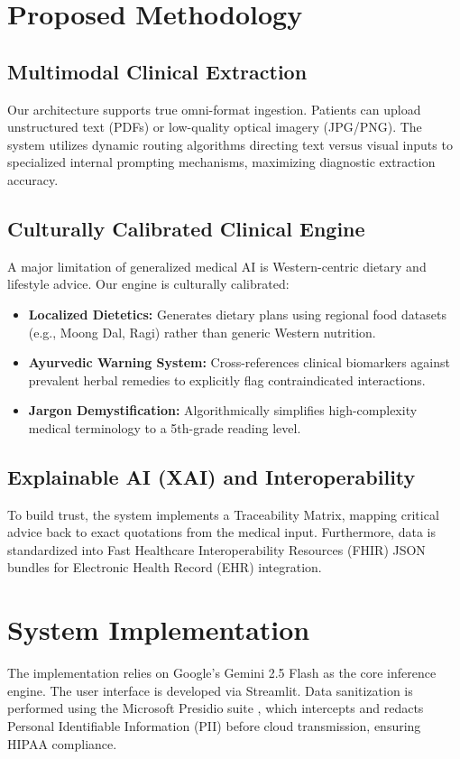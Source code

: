 \documentclass[conference]{IEEEtran}
\begin{document}
\section{Proposed Methodology}

\subsection{Multimodal Clinical Extraction}
Our architecture supports true omni-format ingestion. Patients can upload unstructured text (PDFs) or low-quality optical imagery (JPG/PNG). The system utilizes dynamic routing algorithms directing text versus visual inputs to specialized internal prompting mechanisms, maximizing diagnostic extraction accuracy.

\subsection{Culturally Calibrated Clinical Engine}
A major limitation of generalized medical AI is Western-centric dietary and lifestyle advice. Our engine is culturally calibrated:
\begin{itemize}
    \item \textbf{Localized Dietetics:} Generates dietary plans using regional food datasets (e.g., Moong Dal, Ragi) rather than generic Western nutrition.
    \item \textbf{Ayurvedic Warning System:} Cross-references clinical biomarkers against prevalent herbal remedies to explicitly flag contraindicated interactions.
    \item \textbf{Jargon Demystification:} Algorithmically simplifies high-complexity medical terminology to a 5th-grade reading level.
\end{itemize}

\subsection{Explainable AI (XAI) and Interoperability}
To build trust, the system implements a Traceability Matrix, mapping critical advice back to exact quotations from the medical input. Furthermore, data is standardized into Fast Healthcare Interoperability Resources (FHIR) JSON bundles for Electronic Health Record (EHR) integration.

\section{System Implementation}
The implementation relies on Google's Gemini 2.5 Flash as the core inference engine. The user interface is developed via Streamlit. Data sanitization is performed using the Microsoft Presidio suite \cite{microsoftpresidio}, which intercepts and redacts Personal Identifiable Information (PII) before cloud transmission, ensuring HIPAA compliance.
\end{document}

